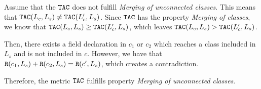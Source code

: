 Assume that the $\verb|TAC|$ does not fulfill \textit{Merging of unconnected classes}. This means that $\verb|TAC|(L_c, L_s) \neq \verb|TAC|(L_c', L_s)$. Since $\verb|TAC|$ has the property \textit{Merging of classes}, we know that $\verb|TAC|(L_c, L_s) \geq \verb|TAC|(L_c', L_s)$, which leaves $\verb|TAC|(L_c, L_s) > \verb|TAC|(L_c', L_s)$.

Then, there exists a field declaration in $c_1$ or $c_2$ which reaches a class included in $L_s$ and is not included in $c$. However, we have that $\verb|R|(c_1, L_s) + \verb|R|(c_2, L_s) = \verb|R|(c', L_s)$, which creates a contradiction.

Therefore, the metric $\verb|TAC|$ fulfills property \textit{Merging of unconnected classes}.
